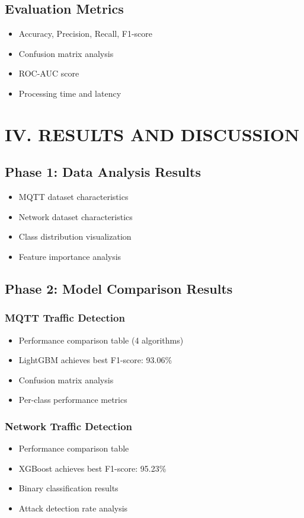 \documentclass[conference]{IEEEtran}
\begin{document}
\subsection{Evaluation Metrics}
\begin{itemize}
    \item Accuracy, Precision, Recall, F1-score
    \item Confusion matrix analysis
    \item ROC-AUC score
    \item Processing time and latency
\end{itemize}

\section{IV. RESULTS AND DISCUSSION}

\subsection{Phase 1: Data Analysis Results}
\begin{itemize}
    \item MQTT dataset characteristics
    \item Network dataset characteristics
    \item Class distribution visualization
    \item Feature importance analysis
\end{itemize}

\subsection{Phase 2: Model Comparison Results}

\subsubsection{MQTT Traffic Detection}
\begin{itemize}
    \item Performance comparison table (4 algorithms)
    \item LightGBM achieves best F1-score: 93.06\%
    \item Confusion matrix analysis
    \item Per-class performance metrics
\end{itemize}

\subsubsection{Network Traffic Detection}
\begin{itemize}
    \item Performance comparison table
    \item XGBoost achieves best F1-score: 95.23\%
    \item Binary classification results
    \item Attack detection rate analysis
\end{itemize}
\end{document}
